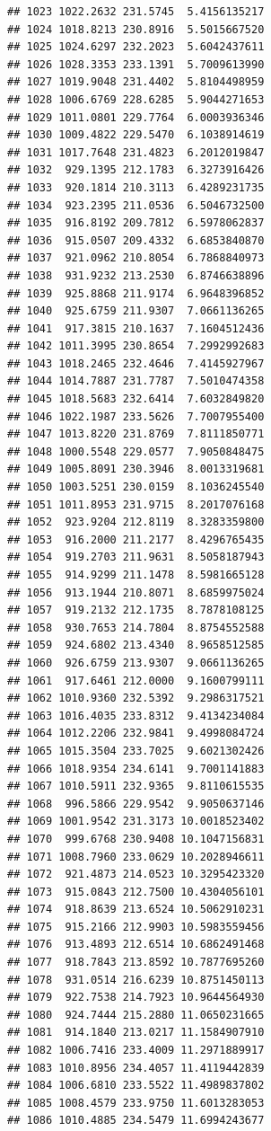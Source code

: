 \documentclass[
]{article}
\begin{document}
\begin{verbatim}
## 1023 1022.2632 231.5745  5.4156135217
## 1024 1018.8213 230.8916  5.5015667520
## 1025 1024.6297 232.2023  5.6042437611
## 1026 1028.3353 233.1391  5.7009613990
## 1027 1019.9048 231.4402  5.8104498959
## 1028 1006.6769 228.6285  5.9044271653
## 1029 1011.0801 229.7764  6.0003936346
## 1030 1009.4822 229.5470  6.1038914619
## 1031 1017.7648 231.4823  6.2012019847
## 1032  929.1395 212.1783  6.3273916426
## 1033  920.1814 210.3113  6.4289231735
## 1034  923.2395 211.0536  6.5046732500
## 1035  916.8192 209.7812  6.5978062837
## 1036  915.0507 209.4332  6.6853840870
## 1037  921.0962 210.8054  6.7868840973
## 1038  931.9232 213.2530  6.8746638896
## 1039  925.8868 211.9174  6.9648396852
## 1040  925.6759 211.9307  7.0661136265
## 1041  917.3815 210.1637  7.1604512436
## 1042 1011.3995 230.8654  7.2992992683
## 1043 1018.2465 232.4646  7.4145927967
## 1044 1014.7887 231.7787  7.5010474358
## 1045 1018.5683 232.6414  7.6032849820
## 1046 1022.1987 233.5626  7.7007955400
## 1047 1013.8220 231.8769  7.8111850771
## 1048 1000.5548 229.0577  7.9050848475
## 1049 1005.8091 230.3946  8.0013319681
## 1050 1003.5251 230.0159  8.1036245540
## 1051 1011.8953 231.9715  8.2017076168
## 1052  923.9204 212.8119  8.3283359800
## 1053  916.2000 211.2177  8.4296765435
## 1054  919.2703 211.9631  8.5058187943
## 1055  914.9299 211.1478  8.5981665128
## 1056  913.1944 210.8071  8.6859975024
## 1057  919.2132 212.1735  8.7878108125
## 1058  930.7653 214.7804  8.8754552588
## 1059  924.6802 213.4340  8.9658512585
## 1060  926.6759 213.9307  9.0661136265
## 1061  917.6461 212.0000  9.1600799111
## 1062 1010.9360 232.5392  9.2986317521
## 1063 1016.4035 233.8312  9.4134234084
## 1064 1012.2206 232.9841  9.4998084724
## 1065 1015.3504 233.7025  9.6021302426
## 1066 1018.9354 234.6141  9.7001141883
## 1067 1010.5911 232.9365  9.8110615535
## 1068  996.5866 229.9542  9.9050637146
## 1069 1001.9542 231.3173 10.0018523402
## 1070  999.6768 230.9408 10.1047156831
## 1071 1008.7960 233.0629 10.2028946611
## 1072  921.4873 214.0523 10.3295423320
## 1073  915.0843 212.7500 10.4304056101
## 1074  918.8639 213.6524 10.5062910231
## 1075  915.2166 212.9903 10.5983559456
## 1076  913.4893 212.6514 10.6862491468
## 1077  918.7843 213.8592 10.7877695260
## 1078  931.0514 216.6239 10.8751450113
## 1079  922.7538 214.7923 10.9644564930
## 1080  924.7444 215.2880 11.0650231665
## 1081  914.1840 213.0217 11.1584907910
## 1082 1006.7416 233.4009 11.2971889917
## 1083 1010.8956 234.4057 11.4119442839
## 1084 1006.6810 233.5522 11.4989837802
## 1085 1008.4579 233.9750 11.6013283053
## 1086 1010.4885 234.5479 11.6994243677

\end{verbatim}
\end{document}
